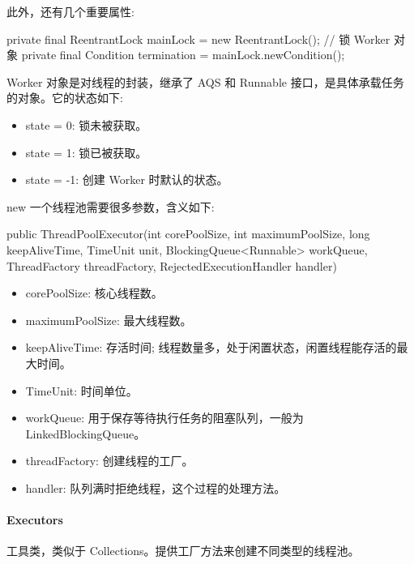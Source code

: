 此外，还有几个重要属性:
\begin{Java}
private final ReentrantLock mainLock = new ReentrantLock();     // 锁 Worker 对象
private final Condition termination = mainLock.newCondition();
\end{Java}

Worker 对象是对线程的封装，继承了 AQS 和 Runnable 接口，是具体承载任务的对象。它的状态如下:
\begin{itemize}
    \item state = 0: 锁未被获取。
    \item state = 1: 锁已被获取。
    \item state = -1: 创建 Worker 时默认的状态。
\end{itemize}

new 一个线程池需要很多参数，含义如下:

\begin{Java}
public ThreadPoolExecutor(int corePoolSize, int maximumPoolSize, long keepAliveTime, TimeUnit unit, BlockingQueue<Runnable> workQueue, ThreadFactory threadFactory, RejectedExecutionHandler handler)
\end{Java}

\begin{itemize}
    \item corePoolSize: 核心线程数。
    \item maximumPoolSize: 最大线程数。
    \item keepAliveTime: 存活时间; 线程数量多，处于闲置状态，闲置线程能存活的最大时间。
    \item TimeUnit: 时间单位。
    \item workQueue: 用于保存等待执行任务的阻塞队列，一般为 LinkedBlockingQueue。
    \item threadFactory: 创建线程的工厂。
    \item handler: 队列满时拒绝线程，这个过程的处理方法。
\end{itemize}

\paragraph*{Executors} 工具类，类似于 Collections。提供工厂方法来创建不同类型的线程池。

